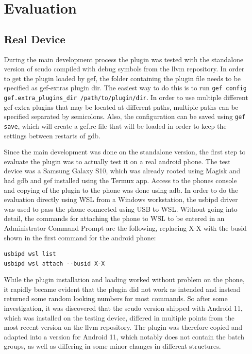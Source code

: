 \documentclass[a4paper,11pt,oneside]{report}
\begin{document}
\chapter{Evaluation}


\section{Real Device}

During the main development process the plugin was tested with the standalone
version of scudo compiled with debug symbols from the llvm repository. In
order to get the plugin loaded by gef, the folder containing the plugin file
needs to be specified as gef-extras plugin dir. The easiest way to do this
is to run \verb|gef config gef.extra_plugins_dir /path/to/plugin/dir|. In order
to use multiple different gef extra plugins that may be located at different
paths, multiple paths can be specified separated by semicolons. Also, the
configuration can be saved using \verb|gef save|, which will create a gef.rc file
that will be loaded in order to keep the settings between restarts of gdb.

Since the main development was done on the standalone version, the first step
to evaluate the plugin was to actually test it on a real android phone. The
test device was a Samsung Galaxy S10, which was already rooted using Magisk
and had gdb and gef installed using the Termux app. Access to the phones
console and copying of the plugin to the phone was done using adb. In order
to do the evaluation directly using WSL from a Windows workstation, the
usbipd driver was used to pass the phone connected using USB to WSL. Without
going into detail, the commands for attaching the phone to WSL to be entered
in an Administrator Command Prompt are the following, replacing X-X with the
busid shown in the first command for the android phone:
\begin{verbatim}
usbipd wsl list
usbipd wsl attach --busid X-X
\end{verbatim}

While the plugin installation and loading worked without problem on the phone, it
rapidly became evident that the plugin did not work as intended and instead
returned some random looking numbers for most commands. So after some
investigation, it was discovered that the scudo version shipped with Android
11, which was installed on the testing device, differed in multiple points
from the most recent version on the llvm repository. The plugin was therefore
copied and adapted into a version for Android 11, which notably does not
contain the batch groups, as well as differing in some minor changes in
different structures.
\end{document}
